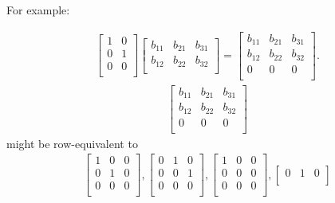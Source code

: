 \documentclass[12pt]{article}
\begin{document}
\begin{enumerate}
    For example:

    \begin{align*}
      \begin{bmatrix}
        1 & 0\\
        0 & 1\\
        0 & 0\\
      \end{bmatrix}
      \begin{bmatrix}
        b_{11} & b_{21} & b_{31}\\
        b_{12} & b_{22} & b_{32}\\
      \end{bmatrix}
      =
      \begin{bmatrix}
        b_{11} & b_{21} & b_{31}\\
        b_{12} & b_{22} & b_{32}\\
        0 & 0 & 0\\
      \end{bmatrix}.
    \end{align*}
    \begin{align*}
      \begin{bmatrix}
        b_{11} & b_{21} & b_{31}\\
        b_{12} & b_{22} & b_{32}\\
        0 & 0 & 0\\
      \end{bmatrix}
    \end{align*}
    might be row-equivalent to
    \begin{align*}
      \begin{bmatrix}
        1 & 0 & 0\\
        0 & 1 & 0\\
        0 & 0 & 0\\
      \end{bmatrix},
      \begin{bmatrix}
        0 & 1 & 0\\
        0 & 0 & 1\\
        0 & 0 & 0\\
      \end{bmatrix},
      \begin{bmatrix}
        1 & 0 & 0\\
        0 & 0 & 0\\
        0 & 0 & 0\\
      \end{bmatrix},
      \begin{bmatrix}
        0 & 1 & 0\\

\end{bmatrix}
\end{align*}
\end{enumerate}
\end{document}
